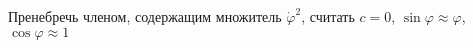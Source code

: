 Пренебречь членом, содержащим множитель $\dot{\varphi}^2$,
считать $c = 0$, $\sin{\varphi} \approx  \varphi$, $\cos{\varphi} \approx 1$
